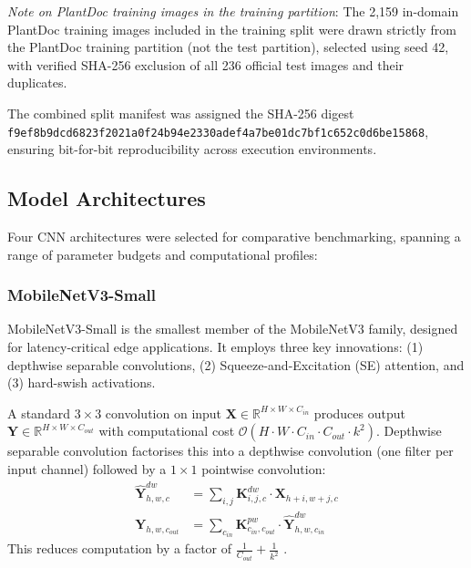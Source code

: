 \documentclass[pdflatex,sn-mathphys-num]{sn-jnl}
\begin{document}
\noindent\textit{Note on PlantDoc training images in the training partition}: The 2{,}159
in-domain PlantDoc training images included in the training split were drawn strictly
from the PlantDoc training partition (not the test partition), selected using seed 42,
with verified SHA-256 exclusion of all 236 official test images and their duplicates.

The combined split manifest was assigned the SHA-256 digest
\texttt{f9ef8b9dcd6823f2021a0f24b94e2330adef4a7be01dc7bf1c652c0d6be15868}, ensuring
bit-for-bit reproducibility across execution environments.

\subsection{Model Architectures}
\label{sec:models}

Four CNN architectures were selected for comparative benchmarking, spanning a range of
parameter budgets and computational profiles:

\subsubsection{MobileNetV3-Small}

MobileNetV3-Small \citep{howard2019mobilenetv3} is the smallest member of the MobileNetV3
family, designed for latency-critical edge applications. It employs three key
innovations: (1) depthwise separable convolutions, (2) Squeeze-and-Excitation (SE)
attention, and (3) hard-swish activations.

A standard $3\times3$ convolution on input $\mathbf{X} \in \mathbb{R}^{H \times W \times C_{in}}$
produces output $\mathbf{Y} \in \mathbb{R}^{H \times W \times C_{out}}$ with computational
cost $\mathcal{O}(H \cdot W \cdot C_{in} \cdot C_{out} \cdot k^2)$. Depthwise separable
convolution factorises this into a depthwise convolution (one filter per input channel)
followed by a $1\times1$ pointwise convolution:
\begin{align}
  \hat{\mathbf{Y}}^{dw}_{h,w,c} &= \sum_{i,j} \mathbf{K}^{dw}_{i,j,c} \cdot \mathbf{X}_{h+i, w+j, c}
  \label{eq:dw_conv} \\
  \mathbf{Y}_{h,w,c_{out}} &= \sum_{c_{in}} \mathbf{K}^{pw}_{c_{in},c_{out}} \cdot
  \hat{\mathbf{Y}}^{dw}_{h,w,c_{in}}
  \label{eq:pw_conv}
\end{align}
This reduces computation by a factor of $\frac{1}{C_{out}} + \frac{1}{k^2}$
\citep{howard2017mobilenets}.
\end{document}
